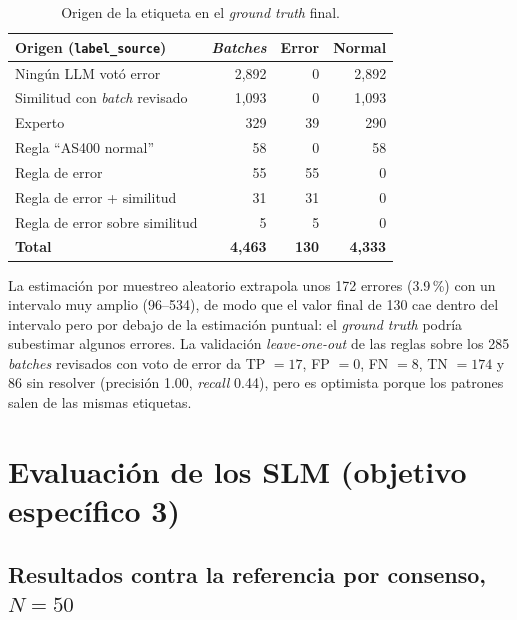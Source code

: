 \begin{table}[H]
\centering
\caption{Origen de la etiqueta en el \textit{ground truth} final.}
\label{tab:res_origen}
\small
\begin{tabular}{@{}lrrr@{}}
\toprule
\textbf{Origen (\texttt{label\_source})} & \textbf{\textit{Batches}} & \textbf{Error} & \textbf{Normal} \\
\midrule
Ningún LLM votó error & 2{,}892 & 0 & 2{,}892 \\
Similitud con \textit{batch} revisado & 1{,}093 & 0 & 1{,}093 \\
Experto & 329 & 39 & 290 \\
Regla ``AS400 normal'' & 58 & 0 & 58 \\
Regla de error & 55 & 55 & 0 \\
Regla de error + similitud & 31 & 31 & 0 \\
Regla de error sobre similitud & 5 & 5 & 0 \\
\textbf{Total} & \textbf{4{,}463} & \textbf{130} & \textbf{4{,}333} \\
\bottomrule
\end{tabular}
\normalsize
\end{table}

La estimación por muestreo aleatorio extrapola unos 172 errores (3.9\,\%) con un intervalo muy amplio (96--534), de modo que el valor final de 130 cae dentro del intervalo pero por debajo de la estimación puntual: el \textit{ground truth} podría subestimar algunos errores. La validación \textit{leave-one-out} de las reglas sobre los 285 \textit{batches} revisados con voto de error da TP $=17$, FP $=0$, FN $=8$, TN $=174$ y 86 sin resolver (precisión 1.00, \textit{recall} 0.44), pero es optimista porque los patrones salen de las mismas etiquetas.

\section{Evaluación de los SLM (objetivo específico 3)}\label{sec:res_slm}

\subsection{Resultados contra la referencia por consenso, $N=50$}\label{subsec:res_n50}

